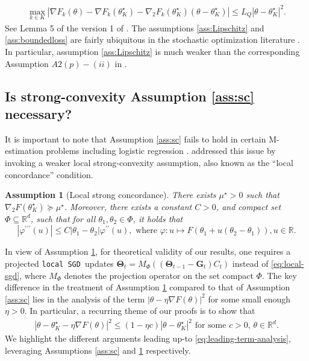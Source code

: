\documentclass[a4paper,11pt]{article}
\numberwithin{equation}{section}
\theoremstyle{plain}
\newtheorem{assumption}{Assumption}[section]
\theoremstyle{remark}
\def\R{\mathbb{R}}
\def\bG{\mathbf{G}}
\def\bT{\mathbf{\Theta}}
\newcommand{\DFL}{\texttt{local SGD}}
\newcommand{\minparam}{\theta^\star_K}
\begin{document}
\begin{align}\label{eq:taylor-series}
   \max_{k \in K}|\nabla F_k(\theta) - \nabla F_k(\minparam) - \nabla_2 F_k(\minparam)(\theta - \minparam) | \leq L_Q |\theta - \minparam|^2.
\end{align}
See Lemma 5 of the version 1 of \cite{sheshukova2025gaussian}. The assumptions \ref{ass:Lipschitz} and \ref{ass:boundedloss} are fairly ubiquitous in the stochastic optimization literature \cite{zhu-2023, wei2023weighted, listochastic}. In particular, assumption \ref{ass:Lipschitz} is much weaker than the corresponding Assumption $A2(p)-(ii)$ in \cite{sheshukova2025gaussian}. 
\subsection{Is strong-convexity Assumption \ref{ass:sc} necessary?}
It is important to note that Assumption \ref{ass:sc} fails to hold in certain M-estimation problems including logistic regression \cite{bachejs}. \cite{songxichen2024} addressed this issue by invoking a weaker local strong-convexity assumption, also known as the ``local concordance'' condition.
\begin{assumption}[Local strong concordance] \label{ass:lsc}
    There exists $\mu^{\star}>0$ such that $\nabla_2 F(\minparam)\succeq \mu^{\star}$. Moreover, there exists a constant $C>0$, and compact set $\Phi \subseteq \R^d$, such that for all $\theta_1, \theta_2 \in \Phi$, it holds that
    \[|\varphi^{\prime \prime \prime}(u)| \leq C\left|{\theta}_1-{\theta}_2\right| \varphi^{\prime \prime}(u), \text { where } \varphi: u \mapsto F\left({\theta}_1+u\left({\theta}_2-{\theta}_1\right)\right), u \in \R.\]
\end{assumption}
In view of Assumption \ref{ass:lsc}, for theoretical validity of our results, one requires a projected \DFL\ updates $\bT_t=M_{\Phi}((\bT_{t-1}- \bG_{t})C_t)$ instead of \eqref{eq:local-sgd}, where $M_{\Phi}$ denotes the projection operator on the set compact $\Phi$. The key difference in the treatment of Assumption \ref{ass:lsc} compared to that of Assumption \ref{ass:sc} lies in the analysis of the term $|\theta - \eta \nabla F(\theta)|^2$ for some small enough $\eta>0$. In particular, a recurring theme of our proofs is to show that 
\begin{align}\label{eq:leading-term-analysis}
    |\theta - \minparam -\eta \nabla F(\theta)|^2 \leq (1-\eta c)|\theta-\minparam|^2  \text{ for some $c>0$, $\theta \in \R^d$}. 
\end{align}
We highlight the different arguments leading up-to \eqref{eq:leading-term-analysis}, leveraging Assumptions \ref{ass:sc} and \ref{ass:lsc} respectively. 
\end{document}
